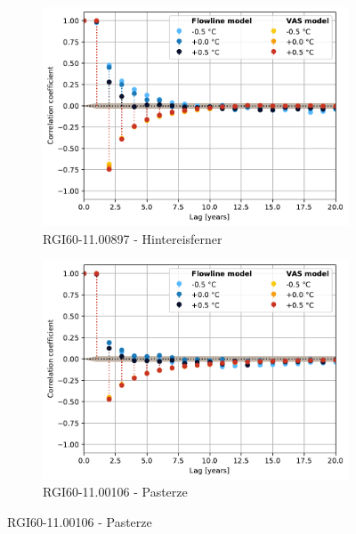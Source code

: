 \begin{figure}[htp]
        \begin{subfigure}[b]{0.48\textwidth}
          \caption{RGI60-11.00897 - Hintereisferner}
          \label{fig:acf:hintereisferner}
          \centering
          \includegraphics[width=\textwidth]{../plots/final_plots/pacf/Hintereisferner.pdf}
        \end{subfigure}
        \hfill
        \begin{subfigure}[b]{0.48\textwidth}
          \caption{RGI60-11.00106 - Pasterze}
          \label{fig:acf:pasterze}
          \centering
          \includegraphics[width=\textwidth]{../plots/final_plots/pacf/Pasterze.pdf}
        \end{subfigure}


\end{figure}
